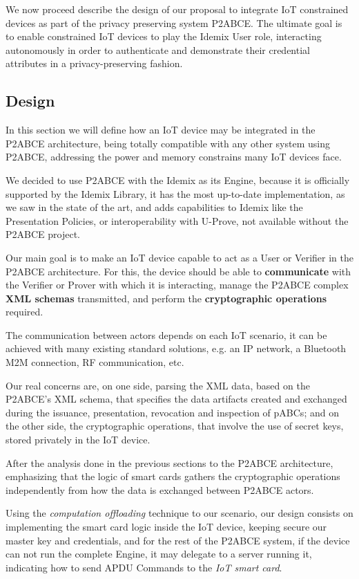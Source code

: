\documentclass[journal]{IEEEtran}
\begin{document}
We now proceed describe the design of our proposal to integrate IoT constrained devices as part of the privacy preserving system P2ABCE. The ultimate goal is to enable constrained IoT devices to play the Idemix User role, interacting autonomously in order to authenticate and demonstrate their credential attributes in a privacy-preserving fashion.

\subsection{Design}

In this section we will define how an IoT device may be integrated in the P2ABCE architecture, being totally compatible with any other system using P2ABCE, addressing the power and memory constrains many IoT devices face.

We decided to use P2ABCE with the Idemix as its Engine, because it is officially supported by the Idemix Library, it has the most up-to-date implementation, as we saw in the state of the art, and adds capabilities to Idemix like the Presentation Policies, or interoperability with U-Prove, not available without the P2ABCE project.

Our main goal is to make an IoT device capable to act as a User or Verifier in the P2ABCE architecture. For this, the device should be able to \textbf{communicate} with the Verifier or Prover with which it is interacting, manage the P2ABCE complex \textbf{XML schemas} transmitted, and perform the \textbf{cryptographic operations} required.

The communication between actors depends on each IoT scenario, it can be achieved with many existing standard solutions, e.g. an IP network, a Bluetooth M2M connection, RF communication, etc.

Our real concerns are, on one side, parsing the XML data, based on the P2ABCE's XML schema, that specifies the data artifacts created and exchanged during the issuance, presentation, revocation and inspection of pABCs; and on the other side, the cryptographic operations, that involve the use of secret keys, stored privately in the IoT device.

After the analysis done in the previous sections to the P2ABCE architecture, emphasizing that the logic of smart cards gathers the cryptographic operations independently from how the data is exchanged between P2ABCE actors. 

Using the \textit{computation offloading} technique to our scenario, our design consists on implementing the smart card logic inside the IoT device, keeping secure our master key and credentials, and for the rest of the P2ABCE system, if the device can not run the complete Engine, it may delegate to a server running it, indicating how to send APDU Commands to the \textit{IoT smart card}.
\end{document}
